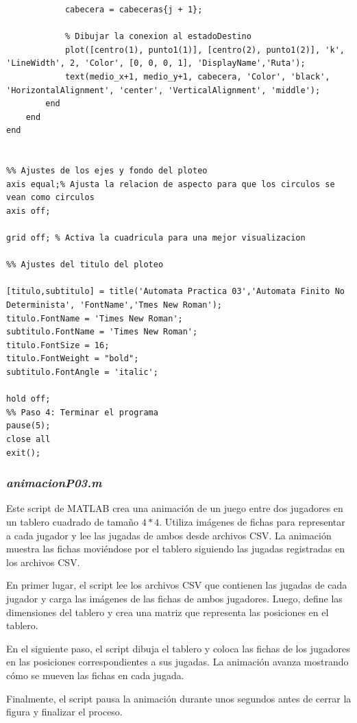 \documentclass{article}
\begin{document}
\begin{lstlisting}[caption={Archivo: \textit{GraficoAutomata} | Script}, style=matlabstyle, basicstyle=\ttfamily\footnotesize]
            % Obtener la cabecera correspondiente
            cabecera = cabeceras{j + 1};

            % Dibujar la conexion al estadoDestino
            plot([centro(1), punto1(1)], [centro(2), punto1(2)], 'k', 'LineWidth', 2, 'Color', [0, 0, 0, 1], 'DisplayName','Ruta');
            text(medio_x+1, medio_y+1, cabecera, 'Color', 'black', 'HorizontalAlignment', 'center', 'VerticalAlignment', 'middle');
        end
    end
end


%% Ajustes de los ejes y fondo del ploteo
axis equal;% Ajusta la relacion de aspecto para que los circulos se vean como circulos
axis off;

grid off; % Activa la cuadricula para una mejor visualizacion

%% Ajustes del titulo del ploteo

[titulo,subtitulo] = title('Automata Practica 03','Automata Finito No Determinista', 'FontName','Tmes New Roman');
titulo.FontName = 'Times New Roman';
subtitulo.FontName = 'Times New Roman';
titulo.FontSize = 16;
titulo.FontWeight = "bold";
subtitulo.FontAngle = 'italic';

hold off;
%% Paso 4: Terminar el programa
pause(5);
close all
exit();
            \end{lstlisting}
        \subsubsection{\textit{animacionP03.m}}
        Este script de MATLAB crea una animación de un juego entre dos jugadores en un tablero cuadrado de tamaño $4*4$.{\@} Utiliza
        imágenes de fichas para representar a cada jugador y lee las jugadas de ambos desde archivos CSV.{\@} La animación muestra las
        fichas moviéndose por el tablero siguiendo las jugadas registradas en los archivos CSV.{\@}

        En primer lugar, el script lee los archivos CSV que contienen las jugadas de cada jugador y carga las imágenes de las fichas
        de ambos jugadores. Luego, define las dimensiones del tablero y crea una matriz que representa las posiciones en el tablero.

        En el siguiente paso, el script dibuja el tablero y coloca las fichas de los jugadores en las posiciones correspondientes a
        sus jugadas. La animación avanza mostrando cómo se mueven las fichas en cada jugada.

        Finalmente, el script pausa la animación durante unos segundos antes de cerrar la figura y finalizar el proceso.
\end{document}
